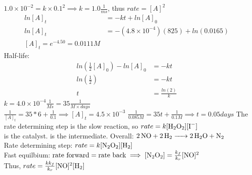 \documentclass[../main.tex]{subfiles}
\begin{document}
\(1.0 \times 10^{-2} = k \times 0.1^2 \implies k = 1.0 \frac{1}{ms}\), thus \(rate = [A]^2\)
\AnswerSet
\begin{equation*}
    \begin{aligned}
    ln[A]_t &= -kt + ln[A]_0 \\
    ln[A]_t &= -(4.8 \times 10^{-4})(825) + ln(0.0165)\\
    [A]_t = e^{-4.50} = 0.0111M 
    \end{aligned}
\end{equation*}
Half-life:
\begin{equation*}
    \begin{aligned}
        ln(\frac{1}{2}[A]_0) - ln[A]_0 &= -kt \\
        ln(\frac{1}{2}) &= -kt \\
        t &= \frac{ln(2)}{k}
    \end{aligned}
\end{equation*}
\AnswerSet
\(k = 4.0 \times 10^{-4} \frac{1}{Ms} = 35\frac{1}{M\times days}\) \\
\(\frac{1}{[A]_t} = 35 * 6 + \frac{1}{0.1} \implies [A]_t = 4.5 \times 10^{-3}\)
\AnswerSet
\(\frac{1}{0.085M} = 35t + \frac{1}{0.1M} \implies t = 0.05days\)
\AnswerSet
{} 
The rate determining step is the slow reaction, so \(rate = k[\ce{H2O2}][\ce{I-}]\)\\
 is the catalyst.  is the intermediate. 
\AnswerSet
Overall: \(\ce{2NO + 2H2 -> 2H2O + N2} \)\\
Rate determining step: \(rate = k[\ce{N2O2}][\ce{H2}]\) \\
Fast equilbium: \(\text{rate forward} = \text{rate back} \implies [\ce{N2O2}] = \frac{k_f}{k_r}[\ce{NO}]^2\) \\
Thus, \(rate = \frac{kk_f}{k_r}[\ce{NO}]^2[\ce{H2}]\)
\end{document}
